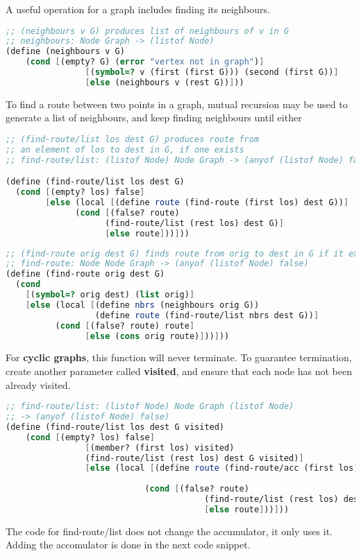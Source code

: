 \documentclass[english, 12pt]{article}
\begin{document}
\begin{exmp}
A useful operation for a graph includes finding its neighbours.
\begin{lstlisting}[language=Scheme]
;; (neighbours v G) produces list of neighbours of v in G
;; neighbours: Node Graph -> (listof Node)
(define (neighbours v G)
	(cond [(empty? G) (error "vertex not in graph")]
				[(symbol=? v (first (first G))) (second (first G))]
				[else (neighbours v (rest G))]))
\end{lstlisting}
\end{exmp}
\begin{exmp}
To find a route between two points in a graph, mutual recursion may be used to generate a list of neighbours, and keep finding neighbours until either 
\begin{lstlisting}[language=Scheme]
;; (find-route/list los dest G) produces route from
;; an element of los to dest in G, if one exists
;; find-route/list: (listof Node) Node Graph -> (anyof (listof Node) false)

(define (find-route/list los dest G)
  (cond [(empty? los) false]
        [else (local [(define route (find-route (first los) dest G))]
              (cond [(false? route)
                    (find-route/list (rest los) dest G)]
                    [else route]))]))
\end{lstlisting}
\begin{lstlisting}[language=Scheme]
;; (find-route orig dest G) finds route from orig to dest in G if it exists
;; find-route: Node Node Graph -> (anyof (listof Node) false)
(define (find-route orig dest G)
  (cond 
    [(symbol=? orig dest) (list orig)]
    [else (local [(define nbrs (neighbours orig G))
                  (define route (find-route/list nbrs dest G))]
          (cond [(false? route) route]
                [else (cons orig route)]))]))
\end{lstlisting}
\end{exmp}
\begin{note}
For \textbf{cyclic graphs}, this function will never terminate. To guarantee termination, create another parameter called \textbf{visited}, and ensure that each node has not been already visited.
\end{note}
\pagebreak
\begin{lstlisting}[language=Scheme]
;; find-route/list: (listof Node) Node Graph (listof Node)
;; -> (anyof (listof Node) false)
(define (find-route/list los dest G visited)
	(cond [(empty? los) false]
				[(member? (first los) visited)
				(find-route/list (rest los) dest G visited)]
				[else (local [(define route (find-route/acc (first los)
																			dest G visited))]
							(cond [(false? route)
										(find-route/list (rest los) dest G visited)]
										[else route]))]))
\end{lstlisting}
The code for find-route/list does not change the accumulator, it only uses it. Adding the accomulator is done in the next code snippet. 
\end{document}
